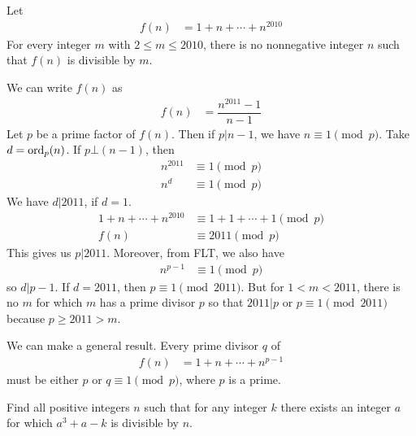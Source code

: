 \documentclass[problems.tex]{subfile}
\begin{document}
	\begin{problem}[Austria $2010$]
		Let	
			\begin{align*}
				f(n) & = 1+n+\cdots+n^{2010}
			\end{align*}
		For every integer $m$ with $2\leq m\leq2010$, there is no nonnegative integer $n$ such that $f(n)$ is divisible by $m$.
	\end{problem}
	
	\begin{solution}
		We can write $f(n)$ as
			\begin{align*}
				f(n) & = \dfrac{n^{2011}-1}{n-1}
			\end{align*}
		Let $p$ be a prime factor of $f(n)$. Then if $p|n-1$, we have $n\equiv1\pmod p$.  Take $d = \operatorname{ord}_p(n)$. If $p\bot (n-1)$, then 
			\begin{align*}
				n^{2011}&\equiv1\pmod p\\
				n^d&\equiv1\pmod p
			\end{align*}
		We have $d|2011$, if $d=1$. 
			\begin{align*}
				1+n+\cdots+n^{2010} & \equiv1+1+\cdots+1\pmod p\\
				f(n) & \equiv2011\pmod p
			\end{align*}
		This gives us $p|2011$. Moreover, from FLT, we also have 
			\begin{align*}
				n^{p-1}&\equiv1\pmod p
			\end{align*}
		so $d|p-1$. If $d=2011$, then $p\equiv1\pmod{2011}$. But for $1<m<2011$, there is no $m$ for which $m$ has a prime divisor $p$ so that $2011|p$ or $p\equiv1\pmod{2011}$ because $p\geq2011>m$.
	\end{solution}
	
	\begin{remark}
		We can make a general result. Every prime divisor $q$ of 
			\begin{align*}
				f(n) & = 1+n+\cdots+n^{p-1}
			\end{align*}
		must be either $p$ or $q\equiv1\pmod p$, where $p$ is a prime.
	\end{remark}
	
	\begin{problem}
		Find all positive integers $n$ such that for any integer $k$ there exists an integer $a$ for which $a^3 + a-k$ is divisible by $n$.
	\end{problem}
	
\end{document}
